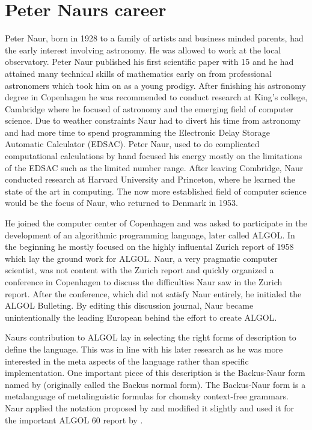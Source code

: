 \documentclass{article}
\begin{document}
\section{Peter Naurs career}

Peter Naur, born in 1928 to a family of artists and business minded parents, had the early interest involving astronomy. He was allowed to work at the local observatory. Peter Naur published his first scientific paper with 15 and he had attained many technical skills of mathematics early on from professional astronomers which took him on as a young prodigy. After finishing his astronomy degree in Copenhagen he was recommended to conduct research at King's college, Cambridge where he focused of astronomy and the emerging field of computer science. Due to weather constraints Naur had to divert his time from astronomy and had more time to spend programming the Electronic Delay Storage Automatic Calculator (EDSAC). Peter Naur, used to do complicated computational calculations by hand focused his energy mostly on the limitations of the EDSAC such as the limited number range. After leaving Combridge, Naur conducted research at Harvard University and Princeton, where he learned the state of the art in computing. The now more established field of computer science would be the focus of Naur, who returned to Denmark in 1953.

He joined the computer center of Copenhagen and was asked to participate in the development of an algorithmic programming language, later called ALGOL. In the beginning he mostly focused on the highly influental Zurich report of 1958 which lay the ground work for ALGOL. Naur, a very pragmatic computer scientist, was not content with the Zurich report and quickly organized a conference in Copenhagen to discuss the difficulties Naur saw in the Zurich report. After the conference, which did not satisfy Naur entirely, he initialed the ALGOL Bulleting. By editing this discussion journal, Naur became unintentionally the leading European behind the effort to create ALGOL. 

Naurs contribution to ALGOL lay in selecting the right forms of description to define the language. This was in line with his later research as he was more interested in the meta aspects of the language rather than specific implementation. One important piece of this description is the Backus-Naur form named by \cite{knuth-ba} (originally called the Backus normal form). The Backus-Naur form is a metalanguage of metalinguistic formulas for chomsky context-free grammars. Naur applied the notation proposed by \cite{Backus1959TheSA} and modified it slightly and used it for the important ALGOL 60 report by \cite{10.1093/comjnl/5.4.349}.
\end{document}
